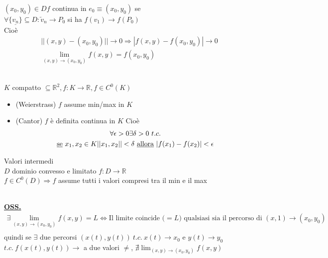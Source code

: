 \documentclass[a4paper, oneside]{article}
\begin{document}
            \begin{definition}
                $(x_0,y_0) \in D f$ continua in $e_0 \equiv(x_0,y_0)$ se \\
                $\forall \{\underline{v_n}\} \subseteq D: \underleftarrow{v}_n \to P_0$ si ha $f(v_1) \to f(P_0)$\\
                Cioè
                \begin{gather*}
                    ||(x,y) - (x_0,y_0) || \to 0 \Rightarrow |f(x,y) - f(x_0,y_0) | \to 0\\
                    \lim_{(x,y) \to (x_0,y_0)} f(x,y) = f(x_0,y_0)
                \end{gather*}
            \end{definition}
            \begin{theorem}
                \hfil\\
                $K $ compatto $\subseteq \mathbb{R}^2, f:K\to \mathbb{R}, f \in C^0(K)$\\
                \begin{itemize}
                    \item (Weierstrass) $f$ assume min/max in $K$
                    \item (Cantor) $f$ è definita continua in $K$ Cioè
                     \begin{gather*}
                        \forall \epsilon >0 \exists \delta >0 \ t.c. \\
                        \text{\underline{se} } x_1,x_2 \in K ||x_1,x_2||<\delta \text{ \underline{allora} } |f(x_1)-f(x_2)|< \epsilon
                     \end{gather*}
                \end{itemize}
            \end{theorem}
            \begin{theorem}
                Valori intermedi\\
                    $D$ dominio convesso e limitato  $f:D\to \mathbb{R}$\\
                    $f \in C^0(D) \Rightarrow f $ assume tutti i valori compresi tra il min e il max
            \end{theorem}

            \hfil\\
            \underline{\textbf{OSS.}}\\
            \begin{gather*}
                \exists \lim_{(x,y) \to (x_0,y_0)}f(x,y) = L \Leftrightarrow \text{Il limite coincide ($=L$) qualsiasi sia il percorso di $(x,1) \to (x_0,y_0)$}\\
            \end{gather*}
            quindi
            se $\exists$ due percorsi $(x(t),y(t)) \ t.c. \  x(t)\to x_0 \text{ e } y(t)\to y_0$\\
            $t.c. \ f(x(t),y(t)) \to $ a due valori $\neq$,  $\nexists \lim_{(x,y) \to (x_0,y_0)} f(x,y)$
\end{document}
